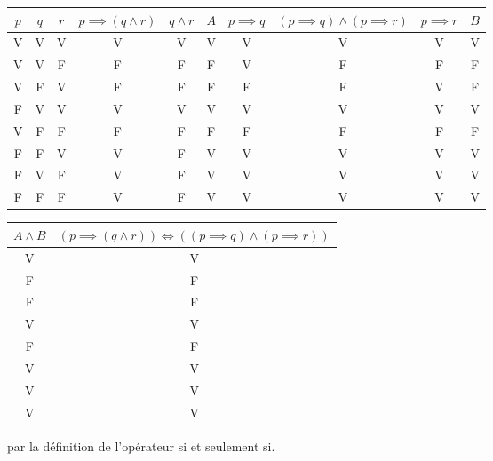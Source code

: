 \documentclass{article}
\begin{document}
\begin{center}
\begin{tabular}{| c | c | c | c | c | c | c | c | c | c |}
\hline
$p$ & $q$ & $r$ & $p \implies (q \land r)$ & $q \land r$ & $A$ & $p \implies q$ & $(p \implies q) \land (p \implies r)$ & $p \implies r$ & $B$\\
\hline
V & V & V & V & V & V & V & V & V & V\\
V & V & F & F & F & F & V & F & F & F\\
V & F & V & F & F & F & F & F & V & F\\
F & V & V & V & V & V & V & V & V & V\\
V & F & F & F & F & F & F & F & F & F\\
F & F & V & V & F & V & V & V & V & V\\
F & V & F & V & F & V & V & V & V & V\\
F & F & F & V & F & V & V & V & V & V\\
\hline
\end{tabular}
\end{center}

\begin{center}
\begin{tabular}{| c | c |}
\hline
$A \land B$ & $(p \implies (q \land r)) \iff ((p \implies q) \land (p \implies r))$\\
\hline
V & V \\
F & F \\
F & F \\
V & V \\
F & F \\
V & V \\
V & V \\
V & V \\
\hline
\end{tabular}
\end{center}

par la définition de l’opérateur si et seulement si.
\end{document}
